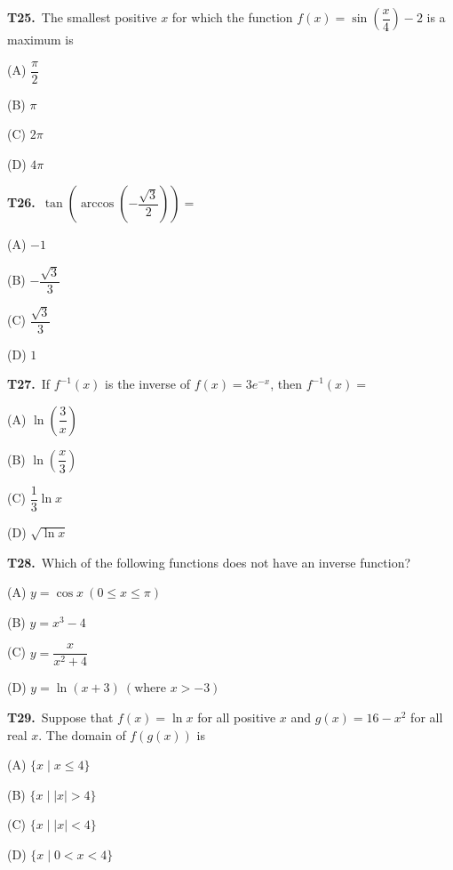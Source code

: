 \documentclass[11pt]{article}
\begin{document}
\bigskip\noindent\textbf{T25.}\ The smallest positive $x$ for which the function $f(x) = \sin\!\left(\dfrac{x}{4}\right) - 2$ is a maximum is
\begin{list}{}{\setlength{\leftmargin}{3em}\setlength{\labelwidth}{2.5em}\setlength{\itemsep}{0pt}\setlength{\topsep}{2pt}}
\item[(A)] $\dfrac{\pi}{2}$
\item[(B)] $\pi$
\item[(C)] $2\pi$
\item[(D)] $4\pi$
\end{list}

\bigskip\noindent\textbf{T26.}\ $\tan\!\left(\arccos\!\left(-\dfrac{\sqrt{3}}{2}\right)\right) =$
\begin{list}{}{\setlength{\leftmargin}{3em}\setlength{\labelwidth}{2.5em}\setlength{\itemsep}{0pt}\setlength{\topsep}{2pt}}
\item[(A)] $-1$
\item[(B)] $-\dfrac{\sqrt{3}}{3}$
\item[(C)] $\dfrac{\sqrt{3}}{3}$
\item[(D)] $1$
\end{list}

\bigskip\noindent\textbf{T27.}\ If $f^{-1}(x)$ is the inverse of $f(x) = 3e^{-x}$, then $f^{-1}(x) =$
\begin{list}{}{\setlength{\leftmargin}{3em}\setlength{\labelwidth}{2.5em}\setlength{\itemsep}{0pt}\setlength{\topsep}{2pt}}
\item[(A)] $\ln\!\left(\dfrac{3}{x}\right)$
\item[(B)] $\ln\!\left(\dfrac{x}{3}\right)$
\item[(C)] $\dfrac{1}{3}\ln x$
\item[(D)] $\sqrt{\ln x}$
\end{list}

\bigskip\noindent\textbf{T28.}\ Which of the following functions does not have an inverse function?
\begin{list}{}{\setlength{\leftmargin}{3em}\setlength{\labelwidth}{2.5em}\setlength{\itemsep}{0pt}\setlength{\topsep}{2pt}}
\item[(A)] $y = \cos x \ (0 \leq x \leq \pi)$
\item[(B)] $y = x^3 - 4$
\item[(C)] $y = \dfrac{x}{x^2+4}$
\item[(D)] $y = \ln(x+3)\ (\text{where } x > -3)$
\end{list}

\bigskip\noindent\textbf{T29.}\ Suppose that $f(x) = \ln x$ for all positive $x$ and $g(x) = 16 - x^2$ for all real $x$. The domain of $f(g(x))$ is
\begin{list}{}{\setlength{\leftmargin}{3em}\setlength{\labelwidth}{2.5em}\setlength{\itemsep}{0pt}\setlength{\topsep}{2pt}}
\item[(A)] $\{x \mid x \leq 4\}$
\item[(B)] $\{x \mid |x| > 4\}$
\item[(C)] $\{x \mid |x| < 4\}$
\item[(D)] $\{x \mid 0 < x < 4\}$
\end{list}
\end{document}
